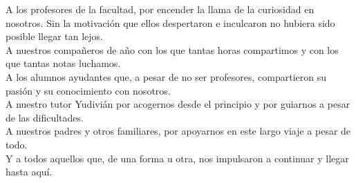 \begin{acknowledgements}
	A los profesores de la facultad, por encender la llama de la curiosidad en nosotros. Sin la motivación
	que ellos despertaron e inculcaron no hubiera sido posible llegar tan lejos.\\

	A nuestros compañeros de año con los que tantas horas compartimos y con los que tantas notas luchamos.\\


	A los alumnos ayudantes que, a pesar de no ser profesores, compartieron su pasión y su conocimiento con 
	nosotros.\\

	A nuestro tutor Yudivián por acogernos desde el principio y por guiarnos a pesar de las dificultades.\\


	A nuestros padres y otros familiares, por apoyarnos en este largo viaje a pesar de todo.\\


	Y a todos aquellos que, de una forma u otra, nos impulsaron a continuar y llegar hasta aquí.
\end{acknowledgements}
